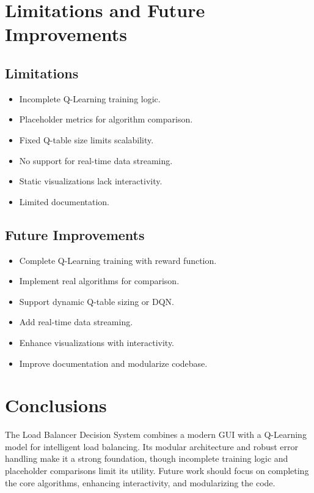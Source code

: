 \documentclass[runningheads]{llncs}
\begin{document}
\section{Limitations and Future Improvements}\label{limitations-and-future-improvements}

\subsection{Limitations}\label{limitations}
\begin{itemize}
    \item Incomplete Q-Learning training logic.
    \item Placeholder metrics for algorithm comparison.
    \item Fixed Q-table size limits scalability.
    \item No support for real-time data streaming.
    \item Static visualizations lack interactivity.
    \item Limited documentation.
\end{itemize}

\subsection{Future Improvements}\label{future-improvements}
\begin{itemize}
    \item Complete Q-Learning training with reward function.
    \item Implement real algorithms for comparison.
    \item Support dynamic Q-table sizing or DQN.
    \item Add real-time data streaming.
    \item Enhance visualizations with interactivity.
    \item Improve documentation and modularize codebase.
\end{itemize}

\section{Conclusions}\label{conclusions}
The Load Balancer Decision System combines a modern GUI with a Q-Learning model for intelligent load balancing. Its modular architecture and robust error handling make it a strong foundation, though incomplete training logic and placeholder comparisons limit its utility. Future work should focus on completing the core algorithms, enhancing interactivity, and modularizing the code.
\end{document}
